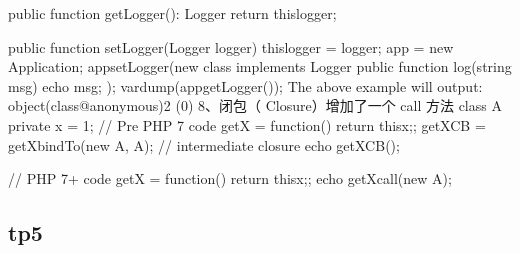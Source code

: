 \documentclass[a4paper,10pt,english]{sphinxmanual}
\begin{document}
\begin{enumerate}
\begin{sphinxVerbatim}[commandchars=\\\{\}]
        public function getLogger(): Logger \PYGZob{}
             return \PYGZdl{}this\PYGZhy{}\PYGZgt{}logger;
        \PYGZcb{}

        public function setLogger(Logger \PYGZdl{}logger) \PYGZob{}
             \PYGZdl{}this\PYGZhy{}\PYGZgt{}logger = \PYGZdl{}logger;
        \PYGZcb{}
    \PYGZcb{}
    \PYGZdl{}app = new Application;
    \PYGZdl{}app\PYGZhy{}\PYGZgt{}setLogger(new class implements Logger \PYGZob{}
        public function log(string \PYGZdl{}msg) \PYGZob{}
            echo \PYGZdl{}msg;
        \PYGZcb{}
    \PYGZcb{});
    var\PYGZus{}dump(\PYGZdl{}app\PYGZhy{}\PYGZgt{}getLogger());
    The above example will output:
    object(class@anonymous)\PYGZsh{}2 (0) \PYGZob{}
    \PYGZcb{}
8、闭包（ Closure）增加了一个 call 方法
    class A \PYGZob{}private \PYGZdl{}x = 1;\PYGZcb{}
    // Pre PHP 7 code
    \PYGZdl{}getX = function() \PYGZob{}return \PYGZdl{}this\PYGZhy{}\PYGZgt{}x;\PYGZcb{};
    \PYGZdl{}getXCB = \PYGZdl{}getX\PYGZhy{}\PYGZgt{}bindTo(new A, \PYGZsq{}A\PYGZsq{}); // intermediate closure
    echo \PYGZdl{}getXCB();

    // PHP 7+ code
    \PYGZdl{}getX = function() \PYGZob{}return \PYGZdl{}this\PYGZhy{}\PYGZgt{}x;\PYGZcb{};
    echo \PYGZdl{}getX\PYGZhy{}\PYGZgt{}call(new A);
\end{sphinxVerbatim}

\end{enumerate}


\subsection{tp5}
\label{\detokenize{program/php:tp5}}
\end{document}
